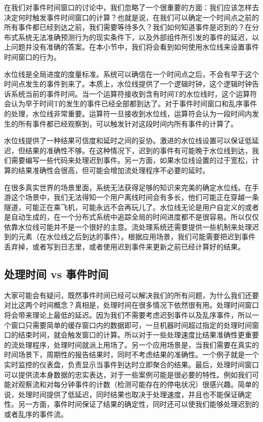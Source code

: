 \documentclass[oneside]{ctexbook}
\begin{document}
在我们对事件时间窗口的讨论中，我们忽略了一个很重要的方面：我们应该怎样去决定何时触发事件时间窗口的计算？也就是说，在我们可以确定一个时间点之前的所有事件都已经到达之前，我们需要等待多久？我们如何知道事件是迟到的？在分布式系统无法准确预测行为的现实条件下，以及外部组件所引发的事件的延迟，以上问题并没有准确的答案。在本小节中，我们将会看到如何使用水位线来设置事件时间窗口的行为。

水位线是全局进度的度量标准。系统可以确信在一个时间点之后，不会有早于这个时间点发生的事件到来了。本质上，水位线提供了一个逻辑时钟，这个逻辑时钟告诉系统当前的事件时间。当一个运算符接收到含有时间T的水位线时，这个运算符会认为早于时间T的发生的事件已经全部都到达了。对于事件时间窗口和乱序事件的处理，水位线非常重要。运算符一旦接收到水位线，运算符会认为一段时间内发生的所有事件都已经观察到，可以触发针对这段时间内所有事件的计算了。

水位线提供了一种结果可信度和延时之间的妥协。激进的水位线设置可以保证低延迟，但结果的准确性不够。在这种情况下，迟到的事件有可能晚于水位线到达，我们需要编写一些代码来处理迟到事件。另一方面，如果水位线设置的过于宽松，计算的结果准确性会很高，但可能会增加流处理程序不必要的延时。

在很多真实世界的场景里面，系统无法获得足够的知识来完美的确定水位线。在手游这个场景中，我们无法得知一个用户离线时间会有多长，他们可能正在穿越一条隧道，可能正在乘飞机，可能永远不会再玩儿了。水位线无论是用户自定义的或者是自动生成的，在一个分布式系统中追踪全局的时间进度都不是很容易。所以仅仅依靠水位线可能并不是一个很好的主意。流处理系统还需要提供一些机制来处理迟到的元素（在水位线之后到达的事件）。根据应用场景，我们可能需要把迟到事件丢弃掉，或者写到日志里，或者使用迟到事件来更新之前已经计算好的结果。

\subsection{处理时间 vs 事件时间}

大家可能会有疑问，既然事件时间已经可以解决我们的所有问题，为什么我们还要对比这两个时间概念？真相是，处理时间在很多情况下依然很有用。处理时间窗口将会带来理论上最低的延迟。因为我们不需要考虑迟到事件以及乱序事件，所以一个窗口只需要简单的缓存窗口内的数据即可，一旦机器时间超过指定的处理时间窗口的结束时间，就会触发窗口的计算。所以对于一些处理速度比结果准确性更重要的流处理程序，处理时间就派上用场了。另一个应用场景是，当我们需要在真实的时间场景下，周期性的报告结果时，同时不考虑结果的准确性。一个例子就是一个实时监控的仪表盘，负责显示当事件到达时立即聚合的结果。最后，处理时间窗口可以提供流本身数据的忠实表达，对于一些案例可能是很必要的特性。例如我们可能对观察流和对每分钟事件的计数（检测可能存在的停电状况）很感兴趣。简单的说，处理时间提供了低延迟，同时结果也取决于处理速度，并且也不能保证确定性。另一方面，事件时间保证了结果的确定性，同时还可以使我们能够处理迟到的或者乱序的事件流。
\end{document}
